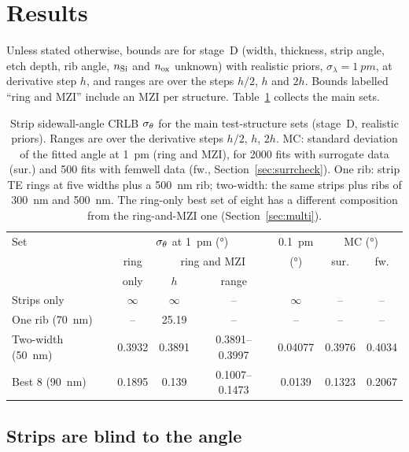 \section{Results}
\label{sec:results}

Unless stated otherwise, bounds are for stage~D (width, thickness, strip angle, etch depth, rib angle, $n_\mathrm{Si}$ and
$n_\mathrm{ox}$ unknown) with realistic priors, $\sigma_\lambda=\qty{1}{pm}$, at derivative step $h$, and ranges are over the
steps $h/2$, $h$ and $2h$. Bounds labelled ``ring and MZI'' include an MZI per structure. Table~\ref{tab:summary}
collects the main sets.

\begin{table}[!t]
\caption{Strip sidewall-angle CRLB $\sigma_\theta$ for the main test-structure sets (stage~D, realistic priors). Ranges are
over the derivative steps $h/2$, $h$, $2h$. MC: standard deviation of the fitted angle at \qty{1}{pm} (ring and
MZI), for 2000 fits with surrogate data (sur.) and 500 fits with femwell data (fw., Section~\ref{sec:surrcheck}). One rib: strip TE rings at five widths plus a \qty{500}{nm} rib; two-width: the same strips plus ribs of \qty{300}{nm} and \qty{500}{nm}. The ring-only best set of eight has a different composition from the
ring-and-MZI one (Section~\ref{sec:multi}).}
\label{tab:summary}
\centering
\setlength{\tabcolsep}{1.5pt}
\begin{tabular}{@{}lcccccc@{}}
\toprule
Set & \multicolumn{3}{c}{$\sigma_\theta$ at \qty{1}{pm} (\si{\degree})} & \qty{0.1}{pm} & \multicolumn{2}{c}{MC (\si{\degree})} \\
 & ring & \multicolumn{2}{c}{ring and MZI} & (\si{\degree}) & sur. & fw. \\
 & only & $h$ & range & & & \\
\midrule
Strips only & $\infty$ & $\infty$ & -- & $\infty$ & -- & -- \\
One rib (\qty{70}{nm}) & -- & 25.19 & -- & -- & -- & -- \\
Two-width (\qty{50}{nm}) & 0.3932 & 0.3891 & 0.3891--0.3997 & 0.04077 & 0.3976 & 0.4034 \\
Best 8 (\qty{90}{nm}) & 0.1895 & 0.139 & 0.1007--0.1473 & 0.0139 & 0.1323 & 0.2067 \\
\bottomrule
\end{tabular}
\end{table}

\subsection{Strips are blind to the angle}

